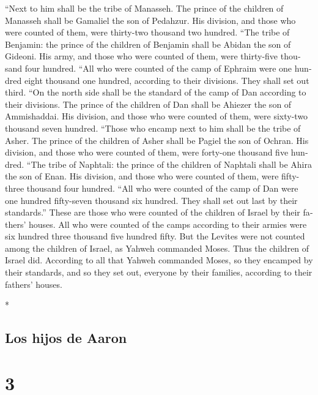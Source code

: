 \begin{paracol}{2}
\begin{otherlanguage}{english}
 ``Next to him shall be the tribe of Manasseh. The prince
of the children of Manasseh shall be Gamaliel the son of Pedahzur.
 His division, and those who were counted of them, were
thirty-two thousand two hundred.  ``The tribe of
Benjamin: the prince of the children of Benjamin shall be Abidan the son
of Gideoni.  His army, and those who were counted of
them, were thirty-five thousand four hundred.  ``All who
were counted of the camp of Ephraim were one hundred eight thousand one
hundred, according to their divisions. They shall set out third.
 ``On the north side shall be the standard of the camp of
Dan according to their divisions. The prince of the children of Dan
shall be Ahiezer the son of Ammishaddai.  His division,
and those who were counted of them, were sixty-two thousand seven
hundred.  ``Those who encamp next to him shall be the
tribe of Asher. The prince of the children of Asher shall be Pagiel the
son of Ochran.  His division, and those who were counted
of them, were forty-one thousand five hundred.  ``The
tribe of Naphtali: the prince of the children of Naphtali shall be Ahira
the son of Enan.  His division, and those who were
counted of them, were fifty-three thousand four hundred. 
``All who were counted of the camp of Dan were one hundred fifty-seven
thousand six hundred. They shall set out last by their standards.''
 These are those who were counted of the children of
Israel by their fathers' houses. All who were counted of the camps
according to their armies were six hundred three thousand five hundred
fifty.  But the Levites were not counted among the
children of Israel, as Yahweh commanded Moses.  Thus the
children of Israel did. According to all that Yahweh commanded Moses, so
they encamped by their standards, and so they set out, everyone by their
families, according to their fathers' houses.

\end{otherlanguage}

\switchcolumn[0]*

\hypertarget{los-hijos-de-aaron}{%
\subsection{Los hijos de Aaron}\label{los-hijos-de-aaron}}

\hypertarget{section-4}{%
\section{3}\label{section-4}}


\end{paracol}
